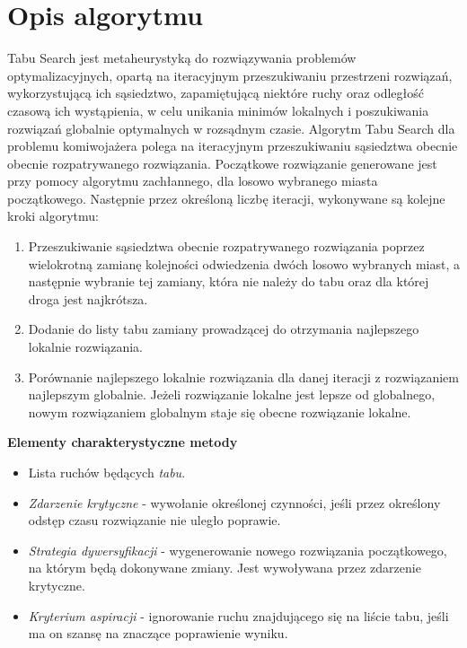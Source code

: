 \documentclass{article}
\begin{document}
\section{Opis algorytmu}
\par Tabu Search jest metaheurystyką do rozwiązywania problemów optymalizacyjnych, opartą na iteracyjnym przeszukiwaniu
przestrzeni rozwiązań, wykorzystującą ich sąsiedztwo, zapamiętującą niektóre ruchy oraz odległość czasową ich wystąpienia, w celu unikania minimów lokalnych i poszukiwania rozwiązań globalnie optymalnych w rozsądnym czasie.
\newline
\newline
Algorytm Tabu Search dla problemu komiwojażera polega na iteracyjnym przeszukiwaniu sąsiedztwa obecnie obecnie rozpatrywanego rozwiązania. Początkowe rozwiązanie generowane jest przy pomocy algorytmu zachłannego, dla losowo wybranego miasta początkowego. Następnie przez określoną liczbę iteracji, wykonywane są kolejne kroki algorytmu: 
	\begin{enumerate}
	\item Przeszukiwanie sąsiedztwa obecnie rozpatrywanego rozwiązania poprzez wielokrotną zamianę kolejności odwiedzenia dwóch losowo wybranych miast, a następnie wybranie tej zamiany, która nie należy do tabu oraz dla której droga jest najkrótsza.
	\item Dodanie do listy tabu zamiany prowadzącej do otrzymania najlepszego lokalnie rozwiązania.
	\item Porównanie najlepszego lokalnie rozwiązania dla danej iteracji z rozwiązaniem najlepszym globalnie. Jeżeli rozwiązanie lokalne jest lepsze od globalnego, nowym rozwiązaniem globalnym staje się obecne rozwiązanie lokalne.
\end{enumerate}

\textbf{Elementy charakterystyczne metody}
\begin{itemize}
	\item Lista ruchów będących\textit{ tabu}.
	\item \textit{Zdarzenie krytyczne} - wywołanie określonej czynności, jeśli przez określony odstęp czasu rozwiązanie nie uległo poprawie.
	\item \textit{Strategia dywersyfikacji} - wygenerowanie nowego rozwiązania początkowego, na którym będą dokonywane zmiany. Jest wywoływana przez zdarzenie krytyczne.
	\item \textit{Kryterium aspiracji} - ignorowanie ruchu znajdującego się na liście tabu, jeśli ma on szansę na znaczące poprawienie wyniku.
\end{itemize}
\newpage
\end{document}
